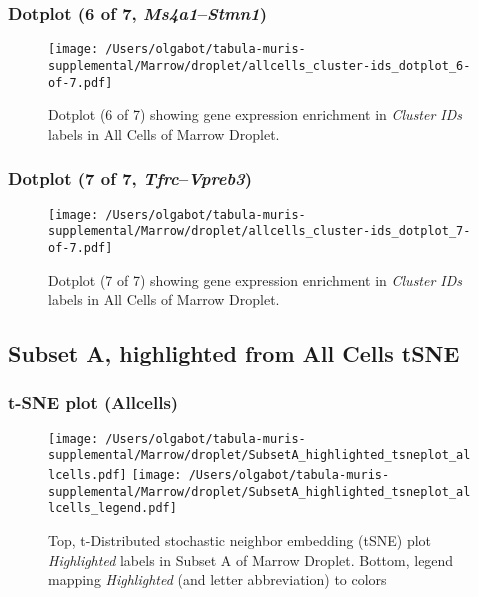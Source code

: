 \clearpage

\subsubsection{Dotplot (6 of 7, \emph{Ms4a1}--\emph{Stmn1})}
\begin{figure}[h]
\centering
\texttt{[image: /Users/olgabot/tabula-muris-supplemental/Marrow/droplet/allcells\_cluster-ids\_dotplot\_6-of-7.pdf]}

\caption{ Dotplot (6 of 7)  showing gene expression enrichment in \emph{Cluster IDs} labels in All Cells of Marrow Droplet. }
\end{figure}


\clearpage

\subsubsection{Dotplot (7 of 7, \emph{Tfrc}--\emph{Vpreb3})}
\begin{figure}[h]
\centering
\texttt{[image: /Users/olgabot/tabula-muris-supplemental/Marrow/droplet/allcells\_cluster-ids\_dotplot\_7-of-7.pdf]}

\caption{ Dotplot (7 of 7)  showing gene expression enrichment in \emph{Cluster IDs} labels in All Cells of Marrow Droplet. }
\end{figure}


\clearpage

\subsection{Subset A, highlighted from All Cells tSNE}

\subsubsection{t-SNE plot (Allcells)}
\begin{figure}[h]
\centering
\texttt{[image: /Users/olgabot/tabula-muris-supplemental/Marrow/droplet/SubsetA\_highlighted\_tsneplot\_allcells.pdf]}
\texttt{[image: /Users/olgabot/tabula-muris-supplemental/Marrow/droplet/SubsetA\_highlighted\_tsneplot\_allcells\_legend.pdf]}
\caption{Top, t-Distributed stochastic neighbor embedding (tSNE) plot  \emph{Highlighted} labels in Subset A of Marrow Droplet. Bottom, legend mapping \emph{Highlighted} (and letter abbreviation) to colors}
\end{figure}


